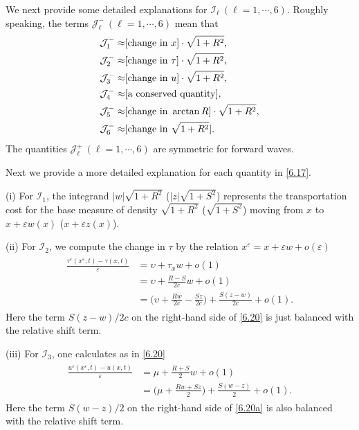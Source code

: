 \documentclass[11pt,reqno]{article}
\newcommand{\eps}{\varepsilon}
\newcommand{\fr}{\frac}
\numberwithin{equation}{section}
\begin{document}
We next provide some detailed explanations for $\mathcal{I}_\ell\ (\ell=1,\cdots,6)$.
Roughly speaking, the terms $\mathcal{J}_{\ell}^-\ (\ell=1,\cdots,6)$ mean that
\begin{align*}
\begin{split}
\mathcal{J}_{1}^-\approx &[{\rm change\ in}\ x]\cdot \sqrt{1+R^2}, \\
\mathcal{J}_{2}^-\approx &[{\rm change\ in}\ \tau]\cdot \sqrt{1+R^2}, \\
\mathcal{J}_{3}^-\approx &[{\rm change\ in}\ u]\cdot \sqrt{1+R^2}, \\
\mathcal{J}_{4}^-\approx &[{\rm a\ conserved\ quantity}],\\
\mathcal{J}_{5}^-\approx &[{\rm change\ in}\ \arctan R]\cdot \sqrt{1+R^2},\\
\mathcal{J}_{6}^-\approx &[{\rm change\ in}\ \sqrt{1+R^2}].
\end{split}
\end{align*}
The quantities $\mathcal{J}_{\ell}^+\ (\ell=1,\cdots,6)$ are symmetric for forward waves.

Next we provide a more detailed explanation for each quantity in \eqref{6.17}.

(i) For $\mathcal{I}_1$, the integrand $|w|\sqrt{1+R^2}$ ($|z|\sqrt{1+S^2}$) represents the transportation cost for the base measure of density $\sqrt{1+R^2}$ ($\sqrt{1+S^2}$) moving from $x$ to $x+\eps w(x)$ ($x+\eps z(x)$).

(ii) For $\mathcal{I}_2$, we compute the change in $\tau$ by the relation $x^\eps=x+\eps w+o(\eps)$
\begin{align}\label{6.20}
\begin{split}
\fr{\tau^\eps(x^\eps,t)-\tau(x,t)}{\eps}
&=\upsilon +\tau_xw +o(1) \\
&=\upsilon +\fr{R-S}{2c}w +o(1) \\
&=\Big(\upsilon +\fr{Rw}{2c} -\fr{Sz}{2c}\Big) +\fr{S(z-w)}{2c} +o(1).
\end{split}
\end{align}
Here the term $S(z-w)/2c$ on the right-hand side of \eqref{6.20} is just balanced with
the relative shift term.

(iii) For $\mathcal{I}_3$, one calculates as in \eqref{6.20}
\begin{align}\label{6.20a}
\begin{split}
\fr{u^\eps(x^\eps,t)-u(x,t)}{\eps}
&=\mu +\fr{R+S}{2}w +o(1) \\
&=\Big(\mu +\fr{Rw +Sz}{2} \Big) +\fr{S(w-z)}{2} +o(1).
\end{split}
\end{align}
Here the term $S(w-z)/2$ on the right-hand side of \eqref{6.20a} is also balanced with
the relative shift term.
\end{document}
